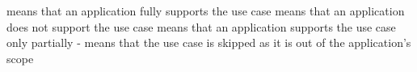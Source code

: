  means that an application fully supports the use case \newline
{} means that an application does not support the use case \newline
{} means that an application supports the use case only partially \newline
- means that the use case is skipped as it is out of the application's scope \newline
